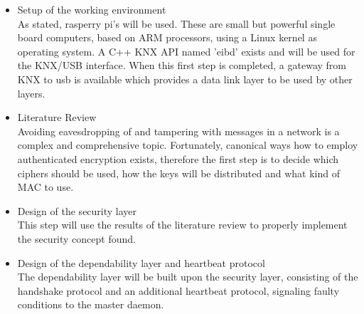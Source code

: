 \documentclass[a4paper,12pt,twoside]{memoir}
\begin{document}
\begin{itemize} 
 \item Setup of the working environment
 \\
 As stated, rasperry pi's will be used. These are small but powerful single board computers, based on ARM processors, 
 using a Linux kernel as operating system. A C++ KNX API named 'eibd' exists and will be used for
 the KNX/USB interface. When this first step is completed, a gateway from KNX to usb is available which
 provides a data link layer to be used by other layers.
 
 \item Literature Review
 \\
 Avoiding eavesdropping of and tampering with messages in a network is a complex and comprehensive
 topic. Fortunately, canonical ways how to employ authenticated
 encryption exists, therefore the first step is to decide which ciphers should be used, how the keys will
 be  distributed and what kind of MAC to use.
 \item Design of the security layer
 \\
 This step will use the results of the literature review to properly implement the security concept found. 
 
 \item Design of the dependability layer and heartbeat protocol
 \\
 The dependability layer will be built upon the security layer, consisting of the handshake protocol and an additional
 heartbeat protocol, signaling faulty conditions to the master daemon.
\end{itemize}
\end{document}
